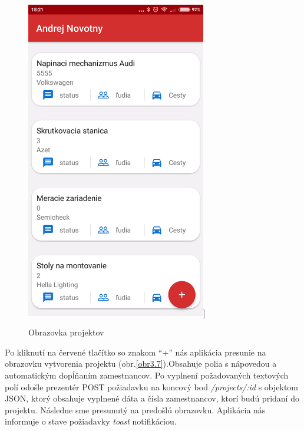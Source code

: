 \vspace{10pt}
\begin{figure}[H]

    \begin{center}
        \begin{minipage}{0.7\linewidth}
            \begin{center}
               \includegraphics[width=0.7\textwidth]{images/screenz/main_screen.png}]   
                \caption{Obrazovka projektov}
                \label{obr3.6}
            \end{center}
        \end{minipage}
    \end{center}
    
\end{figure}
\vspace{10pt}


Po kliknutí na červené tlačítko so znakom ``+'' nás aplikácia presunie na obrazovku vytvorenia projektu (obr.\ref{obr3.7}).Obsahuje polia s nápovedou a automatickým dopĺňaním zamestnancov. Po vyplnení  požadovaných textových polí  odošle prezentér POST požiadavku na koncový bod  \textit{/projects/:id} s objektom JSON, ktorý obsahuje vyplnené dáta a čísla zamestnancov, ktorí budú pridaní do projektu. Následne sme presunutý na predošlú obrazovku. Aplikácia nás informuje o stave požiadavky \textit{toast} notifikáciou. 

